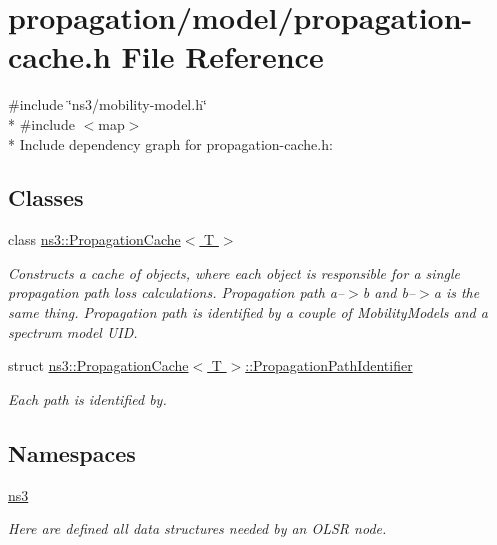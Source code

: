 \hypertarget{propagation-cache_8h}{}\section{propagation/model/propagation-\/cache.h File Reference}
\label{propagation-cache_8h}
{\ttfamily \#include \char`\"{}ns3/mobility-\/model.\+h\char`\"{}}\\*
{\ttfamily \#include $<$map$>$}\\*
Include dependency graph for propagation-\/cache.h\+:
\subsection*{Classes}
\begin{DoxyCompactItemize}
\item 
class \hyperlink{classns3_1_1PropagationCache}{ns3\+::\+Propagation\+Cache$<$ T $>$}
\begin{DoxyCompactList}\small\item\em Constructs a cache of objects, where each object is responsible for a single propagation path loss calculations. Propagation path a--$>$b and b--$>$a is the same thing. Propagation path is identified by a couple of Mobility\+Models and a spectrum model U\+ID. \end{DoxyCompactList}\item 
struct \hyperlink{structns3_1_1PropagationCache_1_1PropagationPathIdentifier}{ns3\+::\+Propagation\+Cache$<$ T $>$\+::\+Propagation\+Path\+Identifier}
\begin{DoxyCompactList}\small\item\em Each path is identified by. \end{DoxyCompactList}\end{DoxyCompactItemize}
\subsection*{Namespaces}
\begin{DoxyCompactItemize}
\item 
 \hyperlink{namespacens3}{ns3}
\begin{DoxyCompactList}\small\item\em Here are defined all data structures needed by an O\+L\+SR node. \end{DoxyCompactList}\end{DoxyCompactItemize}
